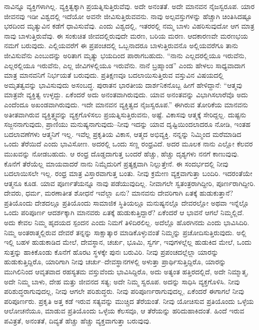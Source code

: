 ನಾವಿನ್ನೂ ವ್ಯಕ್ತಿಗಳಾಗಿಲ್ಲ. ವ್ಯಕ್ತಿತ್ವಕ್ಕಾಗಿ ಪ್ರಯತ್ನಿಸುತ್ತಿರುವೆವು. ಅದೇ ಅನಂತತೆ. ಅದೇ ಮಾನವನ ನೈಜಸ್ವರೂಪ. ಯಾರ ಜೀವನವು ಇಡೀ ವಿಶ್ವದಲ್ಲಿ ಇದೆಯೋ ಅವನೇ ಜೀವಿಸುತ್ತಿರುವವನು. ನಾವು ಅಲ್ಪವಸ್ತುಗಳನ್ನು ಹೆಚ್ಚಾಗಿ ಚಿಂತಿಸಿದಷ್ಟೂ ಭರದಿಂದ ಮೃತ್ಯುವಿನ ಕಡೆಗೆ ಧಾವಿಸುವೆವು. ಎಂದು ವಿಶ್ವದಲ್ಲಿ, ಇತರರಲ್ಲಿ ನಮ್ಮ ಬಾಳು ವಿಹರಿಸುವುದೋ ಆಗ ಮಾತ್ರ ನಾವು ಬಾಳುತ್ತಿರುವೆವು. ಈ ಸಂಕುಚಿತ ಜೀವದಲ್ಲಿರುವುದೇ ಮರಣ, ಬರಿಯ ಮರಣ. ಆದಕಾರಣವೇ ಮರಣಭಯ ನಮಗೆ ಬರುವುದು. ಎಲ್ಲಿಯವರೆಗೆ ಈ ಪ್ರಪಂಚದಲ್ಲಿ ಒಬ್ಬನಾದರೂ ಬಾಳುತ್ತಿರುವನೊ ಅಲ್ಲಿಯವರೆಗೂ ತಾನು ಜೀವಿಸುವೆನು ಎಂಬುದನ್ನು ಅರಿತಾಗ ಮೃತ್ಯು ಭಯದಿಂದ ಪಾರಾಗಬಹುದು. “ನಾನು ಎಲ್ಲದರಲ್ಲಿಯೂ ಇರುವೆನು, ಎಲ್ಲರಲ್ಲಿಯೂ ಇರುವೆನು, ಎಲ್ಲ ಜೀವಿಗಳಲ್ಲಿಯೂ ಇರುವೆನು. ನಾನೆ ಬ್ರಹ್ಮಾಂಡ” ಎಂದು ಹೇಳಲು ಸಾಧ್ಯವಾದಾಗ ಮಾತ್ರ ಮಾನವನಿಗೆ ನಿರ್ಭಯತೆ ಬರುವುದು. ಪ್ರತಿಕ್ಷಣವೂ ಬದಲಾಯಿಸುತ್ತಿರುವ ವಸ್ತುವಿನ ವಿಷಯದಲ್ಲಿ ಅಮೃತತ್ವವನ್ನು ಭಾವಿಸುವುದು ಅಸಂಬದ್ಧ. ಪುರಾತನ ಭಾರತೀಯ ದಾರ್ಶನಿಕನೊಬ್ಬ ಹೀಗೆ ಹೇಳಿದ್ದಾನೆ: “ಆತ್ಮವು ಮಾತ್ರವೇ ವ್ಯಕ್ತಿತ್ವ ಉಳ್ಳದ್ದು. ಏಕೆಂದರೆ ಅದು ಅನಂತವಾಗಿರುವುದು. ಯಾವ ಅನಂತವನ್ನು ವಿಭಾಗಿಸಲಾರೆವೊ ಅದು ಎಂದೆಂದೂ ಅಖಂಡವಾಗಿರುವುದು. ಇದೇ ಮಾನವನ ವ್ಯಕ್ತಿತ್ವದ ನೈಜಸ್ವರೂಪ.” ಈಗಿರುವ ತೋರಿಕೆಯ ಮಾನವನು ಅತೀತವಾಗಿರುವ ವ್ಯಕ್ತಿತ್ತ್ವವನ್ನು ವ್ಯಕ್ತಗೊಳಿಸಲು ಪ್ರಯತ್ನಿಸುತ್ತಿರುವನು, ಅಷ್ಟೆ. ವಿಕಾಸವು ಆತ್ಮಕ್ಕೆ ಸೇರಿದ್ದಲ್ಲ. ದುಷ್ಟನು ಸಜ್ಜನನಾಗುವುದು, ಪ್ರಾಣಿಯು ಮನುಷ್ಯನಾಗುವುದು–ನೀವು ಇದನ್ನು ಯಾವ ದೃಷ್ಟಿಯಿಂದಲಾದರೂ ನೋಡಿ, ಇಂತಹ ಬದಲಾವಣೆಗಳು ಆತ್ಮನಿಗೆ ಇಲ್ಲ. ಇವೆಲ್ಲ ಪ್ರಕೃತಿಯ ವಿಕಾಸ, ಆತ್ಮದ ಅಭಿವ್ಯಕ್ತಿ. ನನ್ನನ್ನು ನಿಮ್ಮಿಂದ ಮರೆಮಾಡಿದ ಒಂದು ತೆರೆಯಿದೆ ಎಂದು ಭಾವಿಸೋಣ. ಅದರಲ್ಲಿ ಒಂದು ಸಣ್ಣ ರಂಧ್ರವಿದೆ. ಅದರ ಮೂಲಕ ನಾನು ಎಲ್ಲೋ ಕೆಲವರ ಮುಖವನ್ನು ನೋಡಬಹುದು. ಆ ರಂಧ್ರ ದೊಡ್ಡದಾಗುತ್ತ ಬಂದರೆ ಹೆಚ್ಚು, ಹೆಚ್ಚು ದೃಶ್ಯಗಳು ನನಗೆ ಕಾಣುವುವು. ಕೊನೆಗೆ ತೆರೆಯೆಲ್ಲ ಮಾಯವಾದರೆ ನಾನು ನಿಮ್ಮೆದುರಿಗೆ ಪ್ರತ್ಯಕ್ಷವಾಗಿ ನಿಲ್ಲುತ್ತೇನೆ. ಈ ಸಂದರ್ಭದಲ್ಲಿ ನೀವು ಬದಲಾಯಿಸಲೇ ಇಲ್ಲ. ರಂಧ್ರ ಮಾತ್ರ ವಿಸ್ತಾರವಾಗುತ್ತ ಬಂತು. ನೀವು ಕ್ರಮೇಣ ವ್ಯಕ್ತವಾಗುತ್ತಾ ಬಂದಿರಿ. ಇದರಂತೆಯೇ ಆತ್ಮನೂ ಕೂಡ. ಯಾವ ಪೂರ್ಣತೆಯನ್ನೂ ನಾವು ಪಡೆಯುವುದಿಲ್ಲ. ನೀವಾಗಲೇ ಸ್ವತಂತ್ರರಾಗಿದ್ದೀರಿ, ಪೂರ್ಣರಾಗಿದ್ದೀರಿ. ದೇವರು, ಧರ್ಮ, ಮರಣಾತೀತ ಶೋಧನೆ ಇವೆಲ್ಲಾ ಏನು? ಮಾನವನು ದೇವರಿಗಾಗಿ ಏತಕ್ಕೆ ಹುಡುಕುತ್ತಾನೆ? ಪ್ರತಿಯೊಂದು ದೇಶದಲ್ಲೂ ಪ್ರತಿಯೊಂದು ಸಾಮಾಜಿಕ ಸ್ಥಿತಿಯಲ್ಲೂ ಮನುಷ್ಯನಲ್ಲೊ ದೇವರಲ್ಲೋ ಅಥವಾ ಇನ್ನೆಲ್ಲೊ ಒಂದು ಪರಿಪೂರ್ಣ ಆದರ್ಶಕ್ಕಾಗಿ ಮಾನವರು ಏತಕ್ಕೆ ಹುಡುಕುತ್ತಿದ್ದಾರೆ? ಏಕೆಂದರೆ ಆ ಭಾವನೆ ಆಗಲೆ ನಿಮ್ಮಲ್ಲಿದೆ. ಅದು ಕೇವಲ ನಿಮ್ಮ ಹೃದಯದ ಸ್ಪಂದನ ಎಂದು ನಿಮಗೆ ತಿಳಿದಿರಲಿಲ್ಲ. ಅದೆಲ್ಲೊ ಹೊರಗಿನದು ಎಂದು ಭಾವಿಸಿದಿರಿ. ನಿಮ್ಮ ಅಂತರಾತ್ಮಲ್ಲಿರುವ ದೇವರೆ ತನ್ನನ್ನು ಸಾಕ್ಷಾತ್ಕಾರ ಮಾಡಿಕೊಳ್ಳುವಂತೆ ನಿಮ್ಮನ್ನು ಪ್ರಚೋದಿಸುತ್ತಿರುವುದು. ಅಲ್ಲಿ ಇಲ್ಲಿ ಬಹಳ ಹುಡುಕಾಡಿದ ಮೇಲೆ, ದೇವಸ್ಥಾನ, ಚರ್ಚು, ಭೂಮಿ, ಸ್ವರ್ಗ, ಇವುಗಳಲ್ಲೆಲ್ಲ ಹುಡುಕಿದ ಮೇಲೆ, ಒಂದು ಸುತ್ತನ್ನು ಹಾಕಿಕೊಂಡು ಕೊನೆಗೆ ಹೊರಟ ಸ್ಥಳಕ್ಕೇ ಪುನಃ ಬರುವಿರಿ. ನೀವು ಪ್ರಪಂಚದಲ್ಲೆಲ್ಲಾ ಯಾರನ್ನು ಹುಡುಕುತ್ತಿದ್ದಿರೊ, ಯಾರಿಗಾಗಿ ನೀವು ಚರ್ಚು–ದೇವಸ್ಥಾನಗಳಲ್ಲಿ ಅಳುತ್ತಾ ಪ್ರಾರ್ಥಿಸುತ್ತಿದ್ದಿರೊ, ಯಾರನ್ನು ಮುಗಿಲಿನಿಂದ ಆವೃತವಾದ ರಹಸ್ಯತಮ ವಸ್ತುವೆಂದು ಭಾವಿಸಿದ್ದಿರೊ, ಅದು ಅತ್ಯಂತ ಹತ್ತಿರದಲ್ಲಿದೆ, ಅದೇ ನಿಮ್ಮಾತ್ಮ, ಅದೇ ನಿಮ್ಮ ಬಾಳು, ದೇಹ ಮತ್ತು ಜೀವನದ ಸತ್ಯ; ಅದೇ ನಿಮ್ಮ ಸ್ವರೂಪ. ಅದನ್ನು ಸಾಧಿಸಿ ವ್ಯಕ್ತಗೊಳಿಸಿ. ನೀವು ಪರಿಶುದ್ಧರಾಗುವುದಲ್ಲ, ನೀವು ಆಗಲೇ ಪರಿಶುದ್ಧರು. ನೀವು ಪರಿಪೂರ್ಣರಾಗುವುದಲ್ಲ, ಏಕೆಂದರೆ ಈಗಾಗಲೆ ನೀವು ಪರಿಪೂರ್ಣರು. ಪ್ರಕೃತಿ ಅತ್ತ ಕಡೆ ಇರುವ ಸತ್ಯವನ್ನು ಮುಚ್ಚಿದ ತೆರೆಯಂತೆ. ನೀವು ಯೋಚಿಸುವ ಪ್ರತಿಯೊಂದು ಒಳ್ಳೆಯ ಆಲೋಚನೆಯೂ, ಮಾಡುವ ಪ್ರತಿಯೊಂದು ಒಳ್ಳೆಯ ಕೆಲಸವೂ, ಆ ತೆರೆಯನ್ನು ಹರಿದುಹಾಕಿದಂತೆ. ಹಿಂದೆ ಇರುವ ಪವಿತ್ರತೆ, ಅನಂತತೆ, ದಿವ್ಯತೆ ಹೆಚ್ಚು ಹೆಚ್ಚು ವ್ಯಕ್ತವಾಗುತ್ತಾ ಬರುವುವು.

